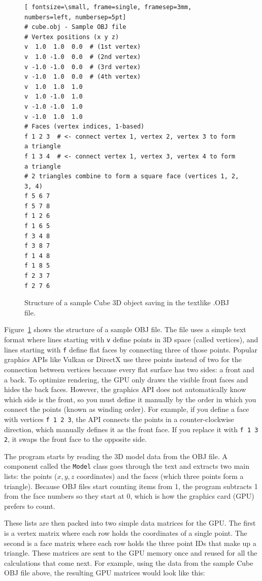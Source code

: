 \begin{figure}[H]
\centering
\begin{Verbatim}[ fontsize=\small, frame=single, framesep=3mm, numbers=left, numbersep=5pt]
# cube.obj - Sample OBJ file
# Vertex positions (x y z)
v  1.0  1.0  0.0  # (1st vertex)
v  1.0 -1.0  0.0  # (2nd vertex)
v -1.0 -1.0  0.0  # (3rd vertex)
v -1.0  1.0  0.0  # (4th vertex)
v  1.0  1.0  1.0
v  1.0 -1.0  1.0
v -1.0 -1.0  1.0
v -1.0  1.0  1.0
# Faces (vertex indices, 1-based)
f 1 2 3  # <- connect vertex 1, vertex 2, vertex 3 to form a triangle
f 1 3 4  # <- connect vertex 1, vertex 3, vertex 4 to form a triangle
# 2 triangles combine to form a square face (vertices 1, 2, 3, 4)
f 5 6 7
f 5 7 8
f 1 2 6
f 1 6 5
f 3 4 8
f 3 8 7
f 1 4 8
f 1 8 5
f 2 3 7
f 2 7 6
\end{Verbatim}
\caption{Structure of a sample Cube 3D object saving in the textlike .OBJ file.}
\label{fig:obj_structure}
\end{figure}

Figure~\ref{fig:obj_structure} shows the structure of a sample OBJ file. The file uses a simple text format where lines starting with \texttt{v} define points in 3D space (called vertices), and lines starting with \texttt{f} define flat faces by connecting three of those points. Popular graphics APIs like Vulkan or DirectX use three points instead of two for the connection between vertices because every flat surface has two sides: a front and a back. To optimize rendering, the GPU only draws the visible front faces and hides the back faces. However, the graphics API does not automatically know which side is the front, so you must define it manually by the order in which you connect the points (known as winding order). For example, if you define a face with vertices \texttt{f 1 2 3}, the API connects the points in a counter-clockwise direction, which manually defines it as the front face. If you replace it with \texttt{f 1 3 2}, it swaps the front face to the opposite side.

The program starts by reading the 3D model data from the OBJ file. A component called the \texttt{Model} class goes through the text and extracts two main lists: the points ($x, y, z$ coordinates) and the faces (which three points form a triangle). Because OBJ files start counting items from 1, the program subtracts 1 from the face numbers so they start at 0, which is how the graphics card (GPU) prefers to count.

These lists are then packed into two simple data matrices for the GPU. The first is a vertex matrix where each row holds the coordinates of a single point. The second is a face matrix where each row holds the three point IDs that make up a triangle. These matrices are sent to the GPU memory once and reused for all the calculations that come next. For example, using the data from the sample Cube OBJ file above, the resulting GPU matrices would look like this:

